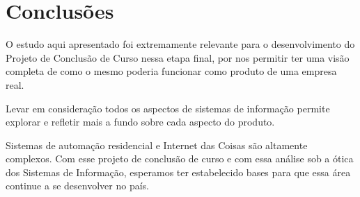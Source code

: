\chapter{Conclusões}

O estudo aqui apresentado foi extremamente relevante para o desenvolvimento do Projeto de Conclusão de Curso nessa etapa final, por nos permitir ter uma visão completa de como o mesmo poderia funcionar como produto de uma empresa real.

Levar em consideração todos os aspectos de sistemas de informação permite explorar e refletir mais a fundo sobre cada aspecto do produto.

Sistemas de automação residencial e Internet das Coisas são altamente complexos. Com esse projeto de conclusão de curso e com essa análise sob a ótica dos Sistemas de Informação, esperamos ter estabelecido bases para que essa área continue a se desenvolver no país.

